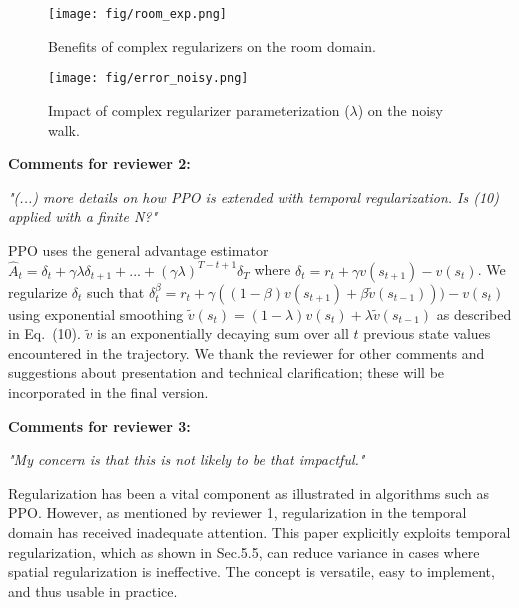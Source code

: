 \documentclass{article}
\begin{document}
\begin{figure}[H]
\begin{minipage}[c]{0.48\linewidth}
\centering
\texttt{[image: fig/room\_exp.png]}
\caption{Benefits of complex regularizers on the room domain.}
\label{fig:room}
\end{minipage}
\hfill
\begin{minipage}[c]{0.48\linewidth}
\centering
\texttt{[image: fig/error\_noisy.png]}
\caption{Impact of complex regularizer parameterization ($\lambda$) on the noisy walk.}
\label{fig:smoothing}
\end{minipage}
\end{figure}


\textbf{Comments for reviewer 2:}

\textit{"(...) more details on how PPO is extended with temporal regularization. Is (10) applied with a finite N?"}

PPO uses the general advantage estimator $\hat{A}_t = \delta_t + \gamma \lambda \delta_{t+1} + ... + (\gamma \lambda)^{T-t+1} \delta_{T}$ where $\delta_t = r_t + \gamma v(s_{t+1}) - v(s_{t})$. We regularize $\delta_t$ such that $\delta_t^{\beta} = r_t + \gamma ((1-\beta)v(s_{t+1}) + \beta \widetilde{v}(s_{t-1}))) - v(s_{t})$ using exponential smoothing $\widetilde{v}(s_{t}) = (1-\lambda)v(s_t) + \lambda \widetilde{v}(s_{t-1})$ as described in Eq.~(10). $\widetilde{v}$ is an exponentially decaying sum over all $t$ previous state values encountered in the trajectory.  We thank the reviewer for other comments and suggestions about presentation and technical clarification; these will be incorporated in the final version.

\textbf{Comments for reviewer 3:}

\textit{"My concern is that this is not likely to be that impactful."}

Regularization has been a vital component as illustrated in algorithms such as PPO. However, as mentioned by reviewer 1, regularization in the temporal domain has received inadequate attention.  This paper explicitly exploits temporal regularization, which as shown in Sec.5.5, can reduce variance in cases where spatial regularization is ineffective.  The concept is versatile, easy to implement, and thus usable in practice.

%
%
\end{document}
